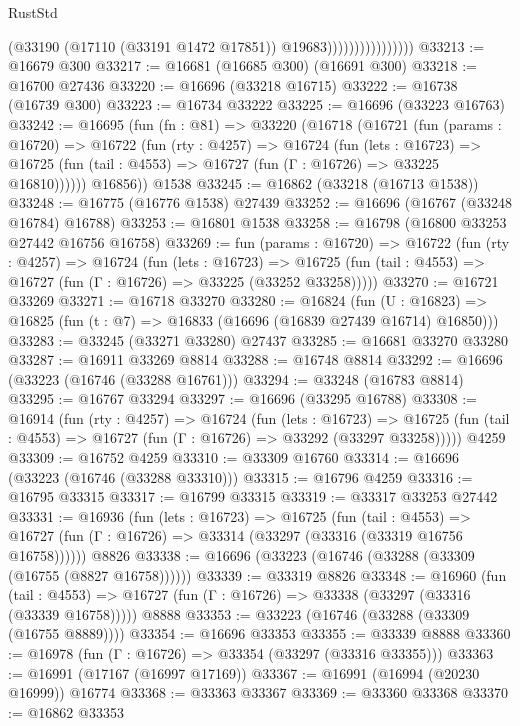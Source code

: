 \begin{lexlean}{RustStd}
\begin{coremodule}
                                  (@33190 (@17110 (@33191 @1472 @17851)) @19683))))))))))))))))
@33213 := @16679 @300
@33217 := @16681 (@16685 @300) (@16691 @300)
@33218 := @16700 @27436
@33220 := @16696 (@33218 @16715)
@33222 := @16738 (@16739 @300)
@33223 := @16734 @33222
@33225 := @16696 (@33223 @16763)
@33242 := @16695
    (fun (fn : @81) =>
    @33220
      (@16718
        (@16721
          (fun (params : @16720) =>
          @16722
            (fun (rty : @4257) =>
            @16724
              (fun (lets : @16723) =>
              @16725 (fun (tail : @4553) => @16727 (fun (Γ : @16726) => @33225 @16810))))))
        @16856))
    @1538
@33245 := @16862 (@33218 (@16713 @1538))
@33248 := @16775 (@16776 @1538) @27439
@33252 := @16696 (@16767 (@33248 @16784) @16788)
@33253 := @16801 @1538
@33258 := @16798 (@16800 @33253 @27442 @16756 @16758)
@33269 := fun (params : @16720) =>
  @16722
    (fun (rty : @4257) =>
    @16724
      (fun (lets : @16723) =>
      @16725 (fun (tail : @4553) => @16727 (fun (Γ : @16726) => @33225 (@33252 @33258)))))
@33270 := @16721 @33269
@33271 := @16718 @33270
@33280 := @16824
    (fun (U : @16823) => @16825 (fun (t : @7) => @16833 (@16696 (@16839 @27439 @16714) @16850)))
@33283 := @33245 (@33271 @33280) @27437
@33285 := @16681 @33270 @33280
@33287 := @16911 @33269 @8814
@33288 := @16748 @8814
@33292 := @16696 (@33223 (@16746 (@33288 @16761)))
@33294 := @33248 (@16783 @8814)
@33295 := @16767 @33294
@33297 := @16696 (@33295 @16788)
@33308 := @16914
    (fun (rty : @4257) =>
    @16724
      (fun (lets : @16723) =>
      @16725 (fun (tail : @4553) => @16727 (fun (Γ : @16726) => @33292 (@33297 @33258)))))
    @4259
@33309 := @16752 @4259
@33310 := @33309 @16760
@33314 := @16696 (@33223 (@16746 (@33288 @33310)))
@33315 := @16796 @4259
@33316 := @16795 @33315
@33317 := @16799 @33315
@33319 := @33317 @33253 @27442
@33331 := @16936
    (fun (lets : @16723) =>
    @16725
      (fun (tail : @4553) =>
      @16727 (fun (Γ : @16726) => @33314 (@33297 (@33316 (@33319 @16756 @16758))))))
    @8826
@33338 := @16696 (@33223 (@16746 (@33288 (@33309 (@16755 (@8827 @16758))))))
@33339 := @33319 @8826
@33348 := @16960
    (fun (tail : @4553) => @16727 (fun (Γ : @16726) => @33338 (@33297 (@33316 (@33339 @16758)))))
    @8888
@33353 := @33223 (@16746 (@33288 (@33309 (@16755 @8889))))
@33354 := @16696 @33353
@33355 := @33339 @8888
@33360 := @16978 (fun (Γ : @16726) => @33354 (@33297 (@33316 @33355)))
@33363 := @16991 (@17167 (@16997 @17169))
@33367 := @16991 (@16994 (@20230 @16999)) @16774
@33368 := @33363 @33367
@33369 := @33360 @33368
@33370 := @16862 @33353

\end{coremodule}
\end{lexlean}
